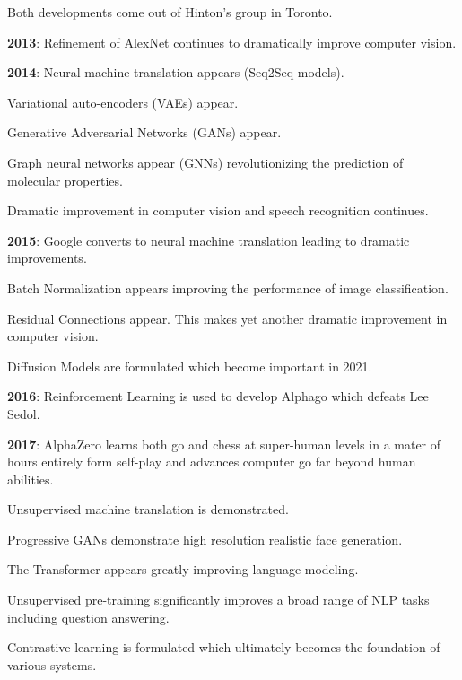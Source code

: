 {\vfill
Both developments come out of Hinton's group in Toronto.

\vfill
{\bf 2013}: Refinement of AlexNet continues to dramatically improve computer vision.


{\bf 2014}: Neural machine translation appears (Seq2Seq models).

\vfill
{\color{red} Variational auto-encoders} (VAEs) appear.

\vfill
{\color{red} Generative Adversarial Networks} (GANs) appear.

\vfill
{\color{red} Graph neural networks appear} (GNNs) revolutionizing the prediction of molecular properties.

\vfill
Dramatic improvement in computer vision and speech recognition continues.


{\bf 2015}: Google converts to neural machine translation leading to dramatic improvements.

\vfill
{\color{red} Batch Normalization} appears improving the performance of image classification.

\vfill
{{\color{red} Residual Connections} appear.  This makes yet another dramatic improvement in computer vision.

\vfill
{\color{red} Diffusion Models} are formulated which become important in 2021.

\vfill
{\bf 2016}: {\color{red} Reinforcement Learning} is used to develop Alphago which defeats Lee Sedol.


{\bf 2017}: AlphaZero learns both go and chess at super-human levels in a mater of hours entirely form self-play and advances computer go far beyond human abilities.

\vfill
Unsupervised machine translation is demonstrated.

\vfill
Progressive GANs demonstrate high resolution realistic face generation.

\vfill
The {\color{red} Transformer} appears greatly improving language modeling.


{\color{red} Unsupervised pre-training} significantly improves a broad range of NLP tasks including question answering.

\vfill

{\color{red} Contrastive learning} is formulated which ultimately becomes the foundation of various systems.

}}
